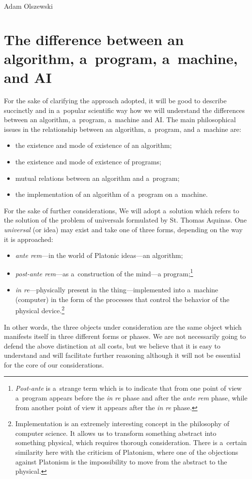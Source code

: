 \begin{artengenv}{Adam Olszewski}
\section{The difference between an algorithm, a~program, a~machine, and AI}
For the sake of clarifying the approach adopted, it will be good to describe succinctly and in a~popular scientific way how we will understand the differences between an algorithm, a~program, a~machine and AI. The main philosophical issues in the relationship between an algorithm, a~program, and a~machine are:

\begin{itemize}
\item the existence and mode of existence of an algorithm;
\item the existence and mode of existence of programs;
\item mutual relations between an algorithm and a~program;
\item the implementation of an algorithm of a~program on a~machine.
\end{itemize}
For the sake of further considerations, We will adopt a~solution which refers to the solution of the problem of universals formulated by St. Thomas Aquinas. One \textit{universal} (or idea) may exist and take one of three forms, depending on the way it is approached:

\begin{itemize}
\item \textit{ante rem}---in the world of Platonic ideas---an algorithm;
\item \textit{post-ante rem}---as a~construction of the mind---a program;\footnote{\textit{Post-ante} is a~strange term which is to indicate that from one point of view a~program appears before the \textit{in re} phase and after the \textit{ante rem} phase, while from another point of view it appears after the \textit{in re} phase.}
\item \textit{in re}---physically present in the thing---implemented into a~machine (computer) in the form of the processes that control the behavior of the physical device.\footnote{Implementation is an extremely interesting concept in the philosophy of computer science. It allows us to transform something abstract into something physical, which requires thorough consideration. There is a~certain similarity here with the criticism of Platonism, where one of the objections against Platonism is the impossibility to move from the abstract to the physical.}
\end{itemize}
In other words, the three objects under consideration are the same object which manifests itself in three different forms or phases. We are not necessarily going to defend the above distinction at all costs, but we believe that it is easy to understand and will facilitate further reasoning although it will not be essential for the core of our considerations.


\end{artengenv}
